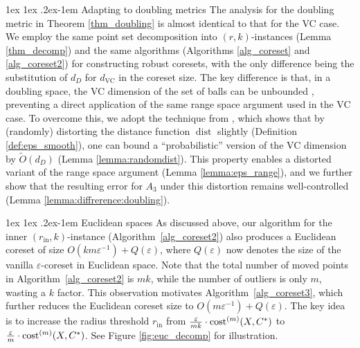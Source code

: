 \documentclass[11pt,letterpaper]{article}
\makeatletter
\renewcommand{\paragraph}{%
  \@startsection{paragraph}{4}%
  {\z@}{1ex \@plus 1ex \@minus .2ex}{-1em}%
  {\normalfont\normalsize\bfseries}%
}
\theoremstyle{definition}
\newcommand{\eps}{\varepsilon}
\renewcommand{\epsilon}{\varepsilon}
\newcommand{\VC}{\ensuremath{\mathrm{VC}}}
\newcommand{\inn}{{\mathrm{in}}}
\DeclareMathOperator{\dist}{dist}
\makeatother
\begin{document}
\paragraph{Adapting to doubling metrics}
The analysis for the doubling metric in Theorem \ref{thm_doubling} is almost identical to that for the VC case.
%
We employ the same point set decomposition into $(r,k)$-instances (Lemma \ref{thm_decomp}) and the same algorithms (Algorithms \ref{alg_coreset} and \ref{alg_coreset2}) for constructing robust coresets,
with the only difference being the substitution of $d_D$ for $d_{\VC}$ in the coreset size.
%
The key difference is that, in a doubling space, the VC dimension of the set of balls can be unbounded \cite{huang2018epsilon}, preventing a direct application of the same range space argument used in the VC case. 
%
To overcome this, we adopt the technique from \cite{huang2018epsilon}, which shows that by (randomly) distorting the distance function \(\dist\) slightly (Definition \ref{def:eps_smooth}), one can bound a ``probabilistic'' version of the VC dimension by \(\tilde{O}(d_D)\) (Lemma \ref{lemma:randomdist}). 
%
This property enables a distorted variant of the range space argument (Lemma \ref{lemma:eps_range}), and we further show that the resulting error for \(A_3\) under this distortion remains well-controlled (Lemma \ref{lemma:diffrerence:doubling}).
%


\paragraph{Euclidean spaces}
As discussed above, our algorithm 
for the inner $(r_{\inn}, k)$-instance (Algorithm~\ref{alg_coreset2}) also produces a Euclidean coreset of size $O(km \eps^{-1}) + Q(\eps)$, where $Q(\eps)$ now denotes the size of the vanilla $\eps$-coreset in Euclidean space.
%
Note that the total number of moved points in Algorithm~\ref{alg_coreset2} is $m k$, while the number of outliers is only $m$, wasting a $ k$ factor. 
%
This observation motivates Algorithm~\ref{alg_coreset3}, which further reduces the Euclidean coreset size to $O(m \eps^{-1}) + Q(\eps)$.
%
The key idea is to increase the radius threshold $r_{\inn}$ from $\frac{\epsilon}{mk} \cdot \cost[m](X, C^\ast)$ to $\frac{\epsilon}{m} \cdot \cost[m](X, C^\ast)$.
%
See Figure \ref{fig:euc_decomp} for illustration.
%
\end{document}
